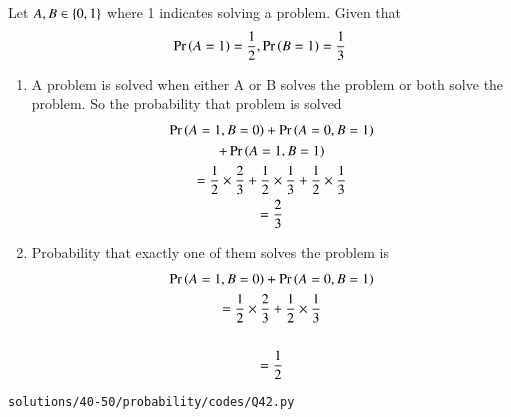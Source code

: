 Let $A, B \in \left\{0,1\right\}$ where 1 indicates solving a problem.  Given that 
\begin{align}
\Pr\left(A = 1\right) = \frac{1}{2},
\Pr\left(B = 1\right) = \frac{1}{3}
\end{align}

\begin{enumerate}
\item A problem is solved when either A or B solves the problem or both solve the problem. So the probability that problem is solved 
\begin{multline}
\Pr\left(A = 1, B= 0\right)
+\Pr\left(A = 0, B= 1\right)
\\
+\Pr\left(A = 1, B= 1\right)
\\
= \frac{1}{2}\times\frac{2}{3} + \frac{1}{2}\times\frac{1}{3} + \frac{1}{2}\times\frac{1}{3}\\
=\frac{2}{3}
\end{multline}
\item Probability that exactly one of them solves the problem is
\begin{multline}
\Pr\left(A = 1, B= 0\right)
+\Pr\left(A = 0, B= 1\right)
\\
= \frac{1}{2}\times\frac{2}{3} + \frac{1}{2}\times\frac{1}{3} \\
\\
= \frac{1}{2}
\end{multline}

\end{enumerate}
\begin{lstlisting}
solutions/40-50/probability/codes/Q42.py
\end{lstlisting}
